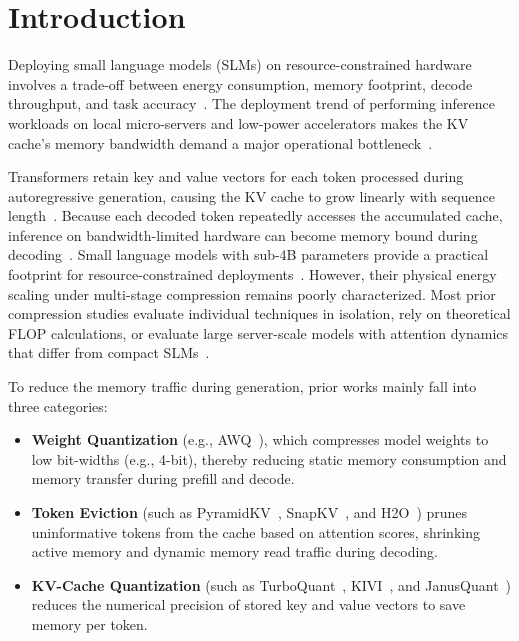 \documentclass[sigconf,nonacm]{acmart}
\begin{document}
\maketitle

\section{Introduction}

Deploying small language models (SLMs) on resource-constrained hardware involves a trade-off between energy consumption, memory footprint, decode throughput, and task accuracy~\cite{strubell_energy_2019,patterson_carbon_2021,schwartz2020green}. The deployment trend of performing inference workloads on local micro-servers and low-power accelerators makes the KV cache's memory bandwidth demand a major operational bottleneck~\cite{li2024survey}.

Transformers retain key and value vectors for each token processed during autoregressive generation, causing the KV cache to grow linearly with sequence length~\cite{li2024survey}. Because each decoded token repeatedly accesses the accumulated cache, inference on bandwidth-limited hardware can become memory bound during decoding~\cite{dao_flashattention_2022}. Small language models with sub-4B parameters provide a practical footprint for resource-constrained deployments~\cite{husom_sustainable_2025}. However, their physical energy scaling under multi-stage compression remains poorly characterized. Most prior compression studies evaluate individual techniques in isolation, rely on theoretical FLOP calculations, or evaluate large server-scale models with attention dynamics that differ from compact SLMs~\cite{wang_slmquant_2025}.

To reduce the memory traffic during generation, prior works mainly fall into three categories:
\begin{itemize}\raggedright
  \item \textbf {Weight Quantization} (e.g., AWQ~\cite{lin_awq_2025}), which compresses model weights to low bit-widths (e.g., 4-bit), thereby reducing static memory consumption and memory transfer during prefill and decode.
  \item \textbf{Token Eviction} (such as PyramidKV~\cite{cai_pyramidkv_2025}, SnapKV~\cite{li_snapkv_2024}, and H2O~\cite{zhang_h2o_2023}) prunes uninformative tokens from the cache based on attention scores, shrinking active memory and dynamic memory read traffic during decoding.
  \item \textbf{KV-Cache Quantization} (such as TurboQuant~\cite{zandieh2026turboquant}, KIVI~\cite{liu_kivi_2023}, and JanusQuant~\cite{sun2026janusquant}) reduces the numerical precision of stored key and value vectors to save memory per token.
\end{itemize}
\end{document}

